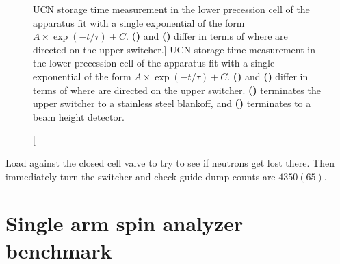 \begin{figure}
\begin{subfigure}{.5\textwidth}
  \caption{}\label{subfig:2022_storage_beam_height_det}
\end{subfigure}
\caption
    [UCN storage time measurement in the lower precession cell of the apparatus fit with a single exponential of the form $A \times \exp(-t/\tau) + C$. \textbf{()} and \textbf{()} differ in terms of where \ucn are directed on the upper switcher.]
    {UCN storage time measurement in the lower precession cell of the apparatus fit with a single exponential of the form $A \times \exp(-t/\tau) + C$. \textbf{()} and \textbf{()} differ in terms of where \ucn are directed on the upper switcher. \textbf{()} terminates the upper switcher to a stainless steel blankoff, and \textbf{()} terminates to a beam height \BZnS \ucn detector.}
\label{fig:2022_ucn_storage}
\end{figure}

Load against the closed cell valve to try to see if neutrons get lost there. Then immediately turn the switcher and check guide dump counts are $4350(65)$.


\section{Single arm spin analyzer benchmark}



